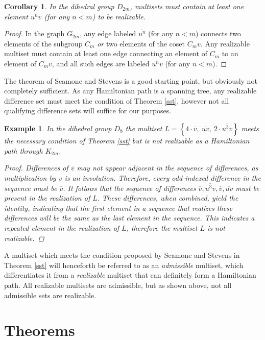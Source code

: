 \documentclass[12pt]{article}
\newtheorem{cor}[thm]{Corollary}
\newtheorem{exa}[thm]{Example}
\newcommand{\setof}[1]{\left\{#1\right\}}
\newcommand{\ol}[1]{\overline{#1}} %
\begin{document}
\begin{cor} \label{needv} In the dihedral group $D_{2m}$, multisets must contain
  at least one element $\ol{u^nv}$ (for any $n < m$) to be realizable.
\end{cor}
\begin{proof}
  In the graph $G_{2m}$, any edge labeled $\ol{u^n}$ (for any $n < m$) connects two elements of
  the subgroup $C_m$ \textit{or} two elements of the coset $C_mv$. Any realizable multiset
  must contain at least one edge connecting an element of $C_m$ to an element of $C_mv$,
  and all such edges are labeled $\ol{u^nv}$ (for any $n < m$).
\end{proof}

The theorem of Seamone and Stevens is a good starting point, but obviously not completely sufficient.
As any Hamiltonian path is a spanning tree, any realizable difference set must meet
the condition of Theorem \ref{sst}, however not all qualifying
difference sets will suffice for our purposes.

\begin{exa}\label{bsst}
  In the dihedral group $D_8$ the multiset $L = \setof{4 \cdot \ol{v},\ \ol{uv},\ 2 \cdot \ol{u^3v}}$
  meets the necessary condition of Theorem \ref{sst} but is not realizable as a Hamiltonian
  path through $K_{2m}$.
\begin{proof}
  Differences of $\ol{v}$ may not appear adjacent in the sequence of differences, as multiplication
  by $v$ is an involution. Therefore, every odd-indexed difference in the sequence must be $\ol{v}$.
  It follows that the sequence of differences $\ol{v}, \ol{u^3v}, \ol{v}, \ol{uv}$ must be present
  in the realization of $L$. These differences, when combined, yield the identity, indicating
  that the first element in a sequence that realizes these differences will be the same as the
  last element in the sequence. This indicates a repeated element in the realization of $L$, therefore
  the multiset $L$ is not realizable.
\end{proof}
\end{exa}

A multiset which meets the condition proposed by Seamone and Stevens in Theorem \ref{sst}
will henceforth be referred to as an \textit{admissible} multiset, which differentiates it from a
\textit{realizable} multiset that can definitely form a Hamiltonian path.
All realizable multisets are admissible, but as shown above, not all admissible sets are realizable.

\section{Theorems}
\end{document}
